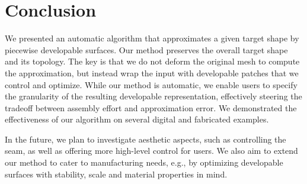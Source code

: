 
\section{Conclusion}  \label{sec:conclusion}
We presented an automatic algorithm that approximates a given target shape by piecewise developable surfaces. Our method preserves the overall target shape and its topology. The key is that we do not deform the original mesh to compute the approximation, but instead wrap the input with developable patches that we control and optimize. 
While our method is automatic, we enable users to specify the granularity of the resulting developable representation, effectively steering the tradeoff between assembly effort and approximation error. We demonstrated the effectiveness of our algorithm on several digital and fabricated examples.

In the future, we plan to investigate aesthetic aspects, such as controlling the seam, as well as offering more high-level control for users. We also aim to extend our method to cater to manufacturing needs, e.g., by optimizing developable surfaces with stability, scale and material properties in mind. 
